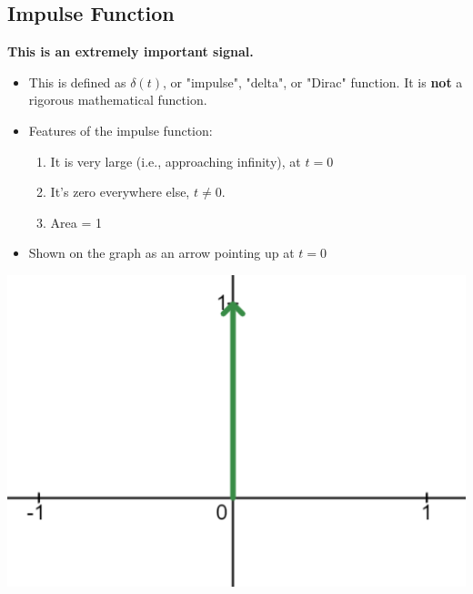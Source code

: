 \documentclass[10pt]{article}
\begin{document}
\subsection*{Impulse Function}
\textbf{This is an extremely important signal.}
\begin{itemize}
    \item This is defined as $\delta(t)$, or "impulse", "delta", or "Dirac" function.  It is \textbf{not} a rigorous mathematical function.
    \item Features of the impulse function:
    \begin{enumerate} 
        \item It is very large (i.e., approaching infinity), at $t = 0$
        \item It's zero everywhere else, $t \neq 0$.
        \item Area = 1
    \end{enumerate}
    \item Shown on the graph as an arrow pointing up at $t = 0$
\end{itemize}
\begin{center}
    \includegraphics[scale=0.5]{W2_7.png}
\end{center}
\end{document}
